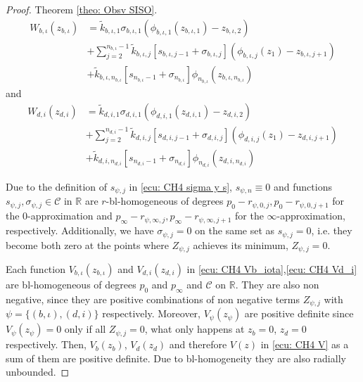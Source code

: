 \documentclass[11pt,letterpaper,twoside,openright]{report}
\newcommand{\RE}{\mathbb{R}}
\begin{document}
\begin{proof}{Theorem \ref{theo: Obsv SISO}. \\}
	\begin{equation}
			\begin{split}\label{ecu: CH4 Wb_iota}
			W_{b,\iota}(z_{b,\iota}) &= \tilde{k}_{b,\iota,1}\sigma_{b,\iota,1}(\phi_{b,\iota,1}(z_{b,\iota,1})-z_{b,\iota,2}) \\
			& + \displaystyle\sum_{j=2}^{n_{b,\iota}-1} \tilde{k}_{b,\iota,j} \left[ s_{b,\iota,j-1}+\sigma_{b,\iota,j} \right] (\phi_{b,\iota,j}(z_1) - z_{b,\iota,j+1}) \\
			& + \tilde{k}_{b,\iota,n_{b,\iota}} \left[ s_{n_{b,\iota}-1} + \sigma_{n_{b,\iota}} \right] \phi_{n_{b,\iota}}(z_{b,\iota,n_{b,\iota}})
		\end{split}
	\end{equation}
and
	\begin{equation}
		\begin{split}\label{ecu: CH4 Wd_i}
		W_{d,i}(z_{d,i}) &= \tilde{k}_{d,i,1}\sigma_{d,i,1}(\phi_{d,i,1}(z_{d,i,1})-z_{d,i,2}) \\
		& + \displaystyle\sum_{j=2}^{n_{d,i}-1} \tilde{k}_{d,i,j} \left[ s_{d,i,j-1}+\sigma_{d,i,j} \right] (\phi_{d,i,j}(z_1) - z_{d,i,j+1}) \\
		& + \tilde{k}_{d,i,n_{d,i}} \left[ s_{n_{d,i}-1} + \sigma_{n_{d,i}} \right] \phi_{n_{d,i}}(z_{d,i,n_{d,i}})
	\end{split}
\end{equation}
	  	
 	Due to the definition of $s_{\psi,j}$ in \eqref{ecu: CH4 sigma y s}, $s_{\psi,n}\equiv 0$ and functions $s_{\psi,j},\sigma_{\psi,j} \in \mathcal{C}$ in $\RE$ are $r$-bl-homogeneous of degrees $p_0-r_{\psi,0,j},p_0-r_{\psi,0,j+1}$ for the 0-approximation and $p_{\infty}-r_{\psi,\infty,j},p_{\infty}-r_{\psi,\infty,j+1}$ for the $\infty$-approximation, respectively. Additionally, we have $\sigma_{\psi,j}=0$ on the same set as $s_{\psi,j}=0$, i.e. they become both zero at the points where $Z_{\psi,j}$ achieves its minimum, $Z_{\psi,j}=0$.
 	
 	Each function $V_{b,\iota}(z_{b,\iota})$ and $V_{d,i}(z_{d,i})$ in \eqref{ecu: CH4 Vb_iota},\eqref{ecu: CH4 Vd_i} are bl-homogeneous of degrees $p_0$ and $p_{\infty}$ and $\mathcal{C}$ on $\RE$. They are also non negative, since they are positive combinations of non negative terms $Z_{\psi,j}$ with $\psi=\{(b,\iota),(d,i)\}$ respectively. Moreover, $V_{\psi}(z_{\psi})$ are positive definite since $V_{\psi}(z_{\psi}) = 0$ only if all $Z_{\psi,j}=0$, what only happens at $z_{b} = 0$, $z_{d} = 0$ respectively. Then, $V_b(z_b)$, $V_d(z_d)$ and therefore $V(z)$ in \eqref{ecu: CH4 V} as a sum of them are positive definite. Due to bl-homogeneity they are also radially unbounded. 
 	

\end{proof}
\end{document}
